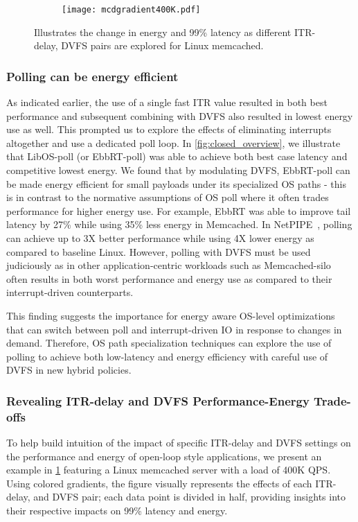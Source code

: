 \begin{figure}[!htb]
\begin{subfigure}{\textwidth}
  \texttt{[image: mcdgradient400K.pdf]}
\end{subfigure}
\caption{\small Illustrates the change in energy and 99\% latency as different ITR-delay, DVFS pairs are explored for Linux memcached.}
\label{fig:gradients}
\end{figure}

\subsubsection{Polling can be energy efficient}
As indicated earlier, the use of a single fast ITR value resulted in both best performance and subsequent combining with DVFS also resulted in lowest energy use as well. This prompted us to explore the effects of eliminating interrupts altogether and use a dedicated poll loop. In \cref{fig:closed_overview}, we illustrate that LibOS-poll (or EbbRT-poll) was able to achieve both best case latency and competitive lowest energy. We found that by modulating DVFS, EbbRT-poll can be made energy efficient for small payloads under its specialized OS paths - this is in contrast to the normative assumptions of OS poll where it often trades performance for higher energy use. For example, EbbRT was able to improve tail latency by 27\% while using 35\% less energy in Memcached. In NetPIPE~\cite{snell1996netpipe}, polling can achieve up to 3X better performance while using 4X lower energy as compared to baseline Linux. However, polling with DVFS must be used judiciously as in other application-centric workloads such as Memcached-silo often results in both worst performance and energy use as compared to their interrupt-driven counterparts.

This finding suggests the importance for energy aware OS-level optimizations that can switch between poll and interrupt-driven IO in response to changes in demand. Therefore, OS path specialization techniques can explore the use of polling to achieve both low-latency and energy efficiency with careful use of DVFS in new hybrid policies.

\subsubsection{Revealing ITR-delay and DVFS Performance-Energy Trade-offs}
\label{sec:open2}
To help build intuition of the impact of specific ITR-delay and DVFS settings on the performance and energy of open-loop style applications, we present an example in \cref{fig:gradients} featuring a Linux memcached server with a load of 400K QPS. Using colored gradients, the figure visually represents the effects of each ITR-delay, and DVFS pair; each data point is divided in half, providing insights into their respective impacts on 99\% latency and energy.

